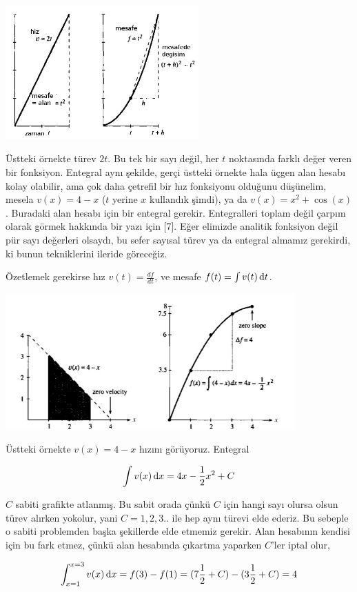 \documentclass[12pt,fleqn]{article}\usepackage{../../common}
\begin{document}
\includegraphics[width=20em]{phy_005_basics_01_03.jpg}

Üstteki örnekte türev $2t$. Bu tek bir sayı değil, her $t$ noktasında
farklı değer veren bir fonksiyon. Entegral aynı şekilde, gerçi üstteki
örnekte hala üçgen alan hesabı kolay olabilir, ama çok daha çetrefil bir
hız fonksiyonu olduğunu düşünelim, mesela $v(x) = 4 - x$ ($t$ yerine $x$
kullandık şimdi), ya da $v(x) = x^2 + \cos(x)$. Buradaki alan hesabı için
bir entegral gerekir. Entegralleri toplam değil çarpım olarak görmek
hakkında bir yazı için [7]. Eğer elimizde analitik fonksiyon değil pür sayı
değerleri olsaydı, bu sefer sayısal türev ya da entegral almamız gerekirdi,
ki bunun tekniklerini ileride göreceğiz.

Özetlemek gerekirse hız $v(t) = \frac{df}{dt}$, ve mesafe $f(t) = \int v(t)\,\mathrm{d} t$.

\includegraphics[width=30em]{phy_005_basics_01_04.jpg}

Üstteki örnekte $v(x) = 4 - x$ hızını görüyoruz. Entegral 

$$ \int v(x) \,\mathrm{d} x = 4x - \frac{1}{2}x^2 + C $$

$C$ sabiti grafikte atlanmış. Bu sabit orada çünkü $C$ için hangi sayı
olursa olsun türev alırken yokolur, yani $C=1,2,3..$ ile hep aynı türevi
elde ederiz. Bu sebeple o sabiti problemden başka şekillerde elde etmemiz
gerekir. Alan hesabının kendisi için bu fark etmez, çünkü alan hesabında
çıkartma yaparken $C$'ler iptal olur, 

$$ 
\int _{x=1}^{x=3} v(x) \,\mathrm{d} x = f(3) - f(1) = 
(7 \frac{1}{2} + C) - (3 \frac{1}{2} + C) = 4
$$
\end{document}
